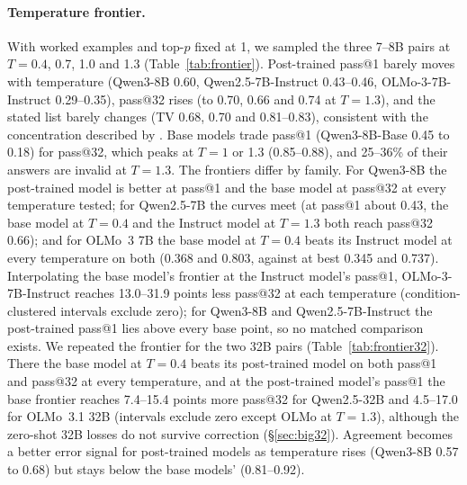 \documentclass[11pt]{article}
\begin{document}
\paragraph{Temperature frontier.} With worked examples and top-$p$ fixed at 1, we sampled the three 7--8B pairs at $T = 0.4$, 0.7, 1.0 and 1.3 (Table~\ref{tab:frontier}). Post-trained pass@1 barely moves with temperature (Qwen3-8B 0.60, Qwen2.5-7B-Instruct 0.43--0.46, OLMo-3-7B-Instruct 0.29--0.35), pass@32 rises (to 0.70, 0.66 and 0.74 at $T{=}1.3$), and the stated list barely changes (TV 0.68, 0.70 and 0.81--0.83), consistent with the concentration described by \citet{yang2026concentration}. Base models trade pass@1 (Qwen3-8B-Base 0.45 to 0.18) for pass@32, which peaks at $T{=}1$ or 1.3 (0.85--0.88), and 25--36\% of their answers are invalid at $T{=}1.3$. The frontiers differ by family. For Qwen3-8B the post-trained model is better at pass@1 and the base model at pass@32 at every temperature tested; for Qwen2.5-7B the curves meet (at pass@1 about 0.43, the base model at $T{=}0.4$ and the Instruct model at $T{=}1.3$ both reach pass@32 0.66); and for OLMo~3 7B the base model at $T{=}0.4$ beats its Instruct model at every temperature on both (0.368 and 0.803, against at best 0.345 and 0.737). Interpolating the base model's frontier at the Instruct model's pass@1, OLMo-3-7B-Instruct reaches 13.0--31.9 points less pass@32 at each temperature (condition-clustered intervals exclude zero); for Qwen3-8B and Qwen2.5-7B-Instruct the post-trained pass@1 lies above every base point, so no matched comparison exists. We repeated the frontier for the two 32B pairs (Table~\ref{tab:frontier32}). There the base model at $T{=}0.4$ beats its post-trained model on both pass@1 and pass@32 at every temperature, and at the post-trained model's pass@1 the base frontier reaches 7.4--15.4 points more pass@32 for Qwen2.5-32B and 4.5--17.0 for OLMo~3.1 32B (intervals exclude zero except OLMo at $T{=}1.3$), although the zero-shot 32B losses do not survive correction (\S\ref{sec:big32}). Agreement becomes a better error signal for post-trained models as temperature rises (Qwen3-8B 0.57 to 0.68) but stays below the base models' (0.81--0.92).
\end{document}
